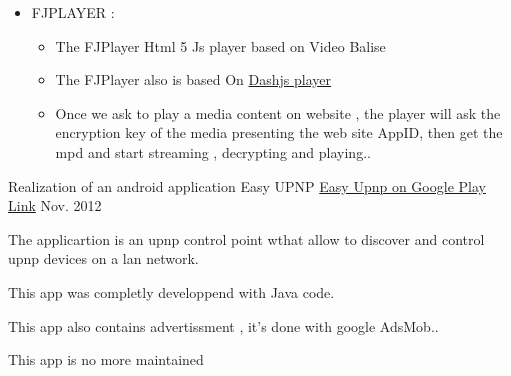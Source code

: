 \begin{cventries}
{\begin{cvitems}
\begin{itemize}
\begin{itemize}
{ streaming}
\item {The UI contains also a dashboard that presents statistics about streams regarding number of watches , clients IP ..}
\end{itemize}
 \item { FJPLAYER :}
 \begin{itemize}
 \item {The FJPlayer Html 5 Js player based on Video Balise }
 \item {The FJPlayer also is based On \href{http://dashif.org/reference/players/javascript/1.4.0/samples/dash-if-reference-player/}{Dashjs player} }
 \item {Once we ask to play a media content on website , the player will ask the encryption key of the media presenting the web site AppID, then get the mpd and start streaming , decrypting  and playing..}
 \end{itemize}
 \end{itemize}
\end{cvitems}
}


\cventry
{Realization of an android application } %
{Easy UPNP} %
{ \href{https://play.google.com/store/apps/details?id=com.EasySoft.easyup}{Easy Upnp on Google Play Link} } %
{Nov. 2012} %
{ %
\begin{cvitems}
\item {The applicartion is an upnp control point wthat allow to discover and control upnp devices on a lan network.}
\item {This app was completly developpend with Java code.}
\item {This app also contains advertissment , it's done with google AdsMob..}
\item {This app is no more maintained}
\end{cvitems}
}



\end{cventries}